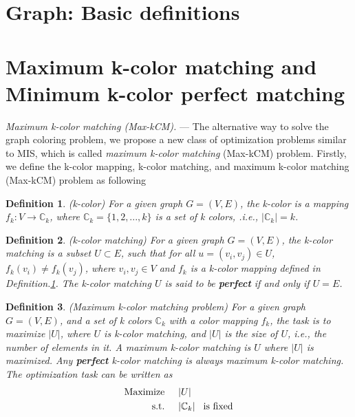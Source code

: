\documentclass[%
 reprint,
nofootinbib,
 amsmath,amssymb,
 aps,
pra,
floatfix,
]{revtex4-2}
\newtheorem{definition}{Definition}
\begin{document}



\clearpage


\onecolumngrid
\appendix

\section{Graph: Basic definitions }

\section{Maximum k-color matching and Minimum k-color perfect matching} \label{Max-Min-kcm}

\emph{Maximum k-color matching {\rm (Max-kCM)}.} ---  The alternative way to solve the graph coloring problem, we propose a new class of optimization problems similar to MIS, which is called \emph{maximum k-color matching} (Max-kCM) problem. Firstly, we define the k-color mapping, k-color matching, and maximum k-color matching (Max-kCM) problem as following 
\begin{definition}
\label{def:k-color}
{\rm (k-color)} For a given graph $G = (V,E)$, the k-color is a mapping $f_k: V \to \mathbb{C}_k$, where $\mathbb{C}_k = \{1,2,...,k\}$ is a set of k colors, .i.e., $|\mathbb{C}_k| = k$.
\end{definition}
\begin{definition}
\label{def:k-color-matching}
{\rm (k-color matching)}
For a given graph $G=(V,E)$, the k-color matching is a subset $U \subset E$, such that for all $u=(v_i,v_j) \in {U}$, $f_k(v_i) \neq f_k(v_j)$, where $v_i,v_j \in V$ and $f_k$ is a k-color mapping defined in {\rm Definition.\ref{def:k-color}}. The k-color matching $U$ is said to be {\rm\textbf{perfect}} if and only if $U=E$.
\end{definition}
\begin{definition}
\label{def:maximum-k-color-matching-problem}
{\rm (Maximum k-color matching problem)} For a given graph $G=(V,E)$, and a set of k colors $\mathbb{C}_k$ with a color mapping $f_k$, the task is to maximize $|U|$, where $U$ is k-color matching, and $|U|$ is the size of $U$, i.e., the number of elements in it. A maximum k-color matching is $U$ where $|U|$ is maximized. Any {\rm \textbf{perfect}} k-color matching is always maximum k-color matching. The optimization task can be written as
\begin{align}\label{eq-max-kcm}
\text{\rm Maximize} \hspace{5mm} &|U|  \nonumber \\
\text{\rm s.t.} \hspace{5mm} &|\mathbb{C}_k| \hspace{3mm} \text{\rm is fixed}   
\end{align}
\end{definition}
\end{document}
